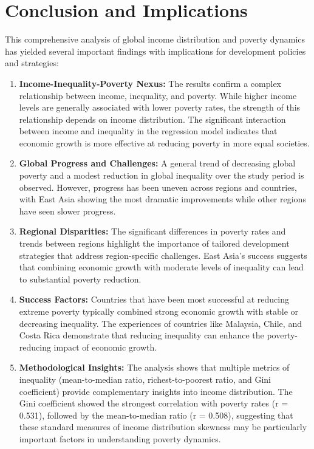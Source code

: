 \documentclass[12pt,a4paper]{article}
\begin{document}
\section{Conclusion and Implications}\label{sec:conclusion}
This comprehensive analysis of global income distribution and poverty dynamics has yielded several important findings with implications for development policies and strategies:
\begin{enumerate}
    \item \textbf{Income-Inequality-Poverty Nexus:} The results confirm a complex relationship between income, inequality, and poverty. While higher income levels are generally associated with lower poverty rates, the strength of this relationship depends on income distribution. The significant interaction between income and inequality in the regression model indicates that economic growth is more effective at reducing poverty in more equal societies.
    \item \textbf{Global Progress and Challenges:} A general trend of decreasing global poverty and a modest reduction in global inequality over the study period is observed. However, progress has been uneven across regions and countries, with East Asia showing the most dramatic improvements while other regions have seen slower progress.
    \item \textbf{Regional Disparities:} The significant differences in poverty rates and trends between regions highlight the importance of tailored development strategies that address region-specific challenges. East Asia's success suggests that combining economic growth with moderate levels of inequality can lead to substantial poverty reduction.
    \item \textbf{Success Factors:} Countries that have been most successful at reducing extreme poverty typically combined strong economic growth with stable or decreasing inequality. The experiences of countries like Malaysia, Chile, and Costa Rica demonstrate that reducing inequality can enhance the poverty-reducing impact of economic growth.
    \item \textbf{Methodological Insights:} The analysis shows that multiple metrics of inequality (mean-to-median ratio, richest-to-poorest ratio, and Gini coefficient) provide complementary insights into income distribution. The Gini coefficient showed the strongest correlation with poverty rates (r = 0.531), followed by the mean-to-median ratio (r = 0.508), suggesting that these standard measures of income distribution skewness may be particularly important factors in understanding poverty dynamics.
\end{enumerate}
\end{document}

